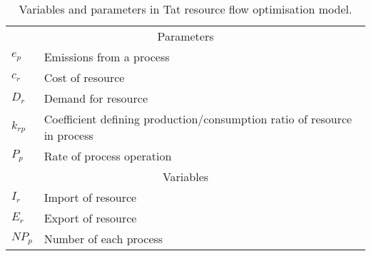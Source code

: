 	\begin{table}[h]
		\centering
		\caption{Variables and parameters in Tat resource flow optimisation model.} \label{tab:tat_params_vars}
			\begin{tabular}{lp{7cm}}
			\toprule
			\multicolumn{2}{c}{Parameters} \\
			$e_p$ & Emissions from a process \\
		        $c_r$ & Cost of resource \\		
			$D_r$ & Demand for resource \\
			$k_{rp}$ & Coefficient defining production/consumption ratio of resource in process \\
			$P_p$ & Rate of process operation \\
			\midrule
			\multicolumn{2}{c}{Variables} \\
			$I_r$ & Import of resource \\ 
			$E_r$ & Export of resource \\
			$NP_p$ & Number of each process \\
			\bottomrule
			\end{tabular}
	\end{table}

